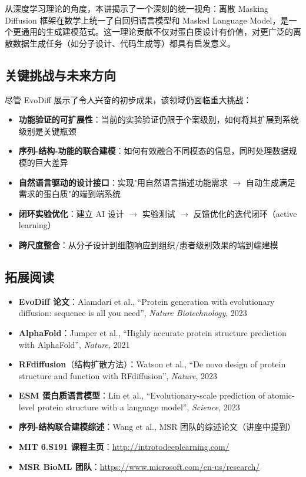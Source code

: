 \documentclass[a4paper]{article}
\begin{document}
从深度学习理论的角度，本讲揭示了一个深刻的统一视角：离散 Masking Diffusion 框架在数学上统一了自回归语言模型和 Masked Language Model，是一个更通用的生成建模范式。这一理论贡献不仅对蛋白质设计有价值，对更广泛的离散数据生成任务（如分子设计、代码生成等）都具有启发意义。

\subsection{关键挑战与未来方向}

尽管 EvoDiff 展示了令人兴奋的初步成果，该领域仍面临重大挑战：

\begin{itemize}
    \item \textbf{功能验证的可扩展性}：当前的实验验证仍限于个案级别，如何将其扩展到系统级别是关键瓶颈
    \item \textbf{序列-结构-功能的联合建模}：如何有效融合不同模态的信息，同时处理数据规模的巨大差异
    \item \textbf{自然语言驱动的设计接口}：实现"用自然语言描述功能需求 $\rightarrow$ 自动生成满足需求的蛋白质"的端到端系统
    \item \textbf{闭环实验优化}：建立 AI 设计 $\rightarrow$ 实验测试 $\rightarrow$ 反馈优化的迭代闭环（active learning）
    \item \textbf{跨尺度整合}：从分子设计到细胞响应到组织/患者级别效果的端到端建模
\end{itemize}

\subsection{拓展阅读}

\begin{itemize}
    \item \textbf{EvoDiff 论文}：Alamdari et al., ``Protein generation with evolutionary diffusion: sequence is all you need'', \textit{Nature Biotechnology}, 2023
    \item \textbf{AlphaFold}：Jumper et al., ``Highly accurate protein structure prediction with AlphaFold'', \textit{Nature}, 2021
    \item \textbf{RFdiffusion}（结构扩散方法）：Watson et al., ``De novo design of protein structure and function with RFdiffusion'', \textit{Nature}, 2023
    \item \textbf{ESM 蛋白质语言模型}：Lin et al., ``Evolutionary-scale prediction of atomic-level protein structure with a language model'', \textit{Science}, 2023
    \item \textbf{序列-结构联合建模综述}：Wang et al., MSR 团队的综述论文（讲座中提到）
    \item \textbf{MIT 6.S191 课程主页}：\url{http://introtodeeplearning.com/}
    \item \textbf{MSR BioML 团队}：\url{https://www.microsoft.com/en-us/research/}
\end{itemize}

\end{document}
